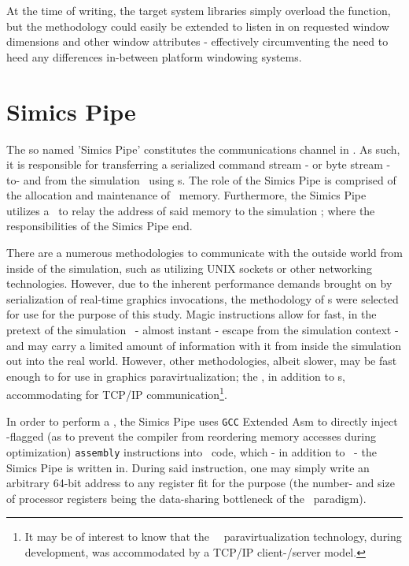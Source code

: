 At the time of writing, the target system libraries simply overload the  function, but the methodology could easily be extended to listen in on requested window dimensions and other window attributes - effectively circumventing the need to heed any differences in-between platform windowing systems.

\section{Simics Pipe}
\label{sec:proposedsolutionandimplementation_simicspipe}
The so named 'Simics Pipe' constitutes the communications channel in \dvttermsimics .
As such, it is responsible for transferring a serialized command stream - or byte stream - to- and from the simulation \dvttermhost\ using \dvttermmagicinstruction s.
The role of the Simics Pipe is comprised of the allocation and maintenance of  \dvttermtarget\ memory.
Furthermore, the Simics Pipe utilizes a \dvttermmagicinstruction\ to relay the address of said memory to the simulation \dvttermhost ; where the responsibilities of the Simics Pipe end.

There are a numerous methodologies to communicate with the outside world from inside of the simulation, such as utilizing UNIX sockets or other networking technologies.
However, due to the inherent performance demands brought on by serialization of real-time graphics invocations, the methodology of \dvttermmagicinstruction s were selected for use for the purpose of this study.
Magic instructions allow for fast, in the pretext of the simulation \dvttermtarget\ - almost instant - escape from the simulation context - and may carry a limited amount of information with it from inside the simulation out into the real world.
However, other methodologies, albeit slower, may be fast enough to for use in graphics paravirtualization; the \dvttermandroidemulator , in addition to \dvttermmagicinstruction s, accommodating for TCP/IP communication\footnote{It may be of interest to know that the \dvttermsimics\ \dvttermopengles\ paravirtualization technology, during development, was accommodated by a TCP/IP client-/server model.}.

In order to perform a \dvttermmagicinstruction , the Simics Pipe uses \texttt{GCC} Extended Asm to directly inject -flagged (as to prevent the compiler from reordering memory accesses during optimization) \texttt{assembly} instructions into \dvttermc\ code, which - in addition to \dvttermcplusplus\ - the Simics Pipe is written in.
During said instruction, one may simply write an arbitrary 64-bit address to any register fit for the purpose (the number- and size of processor registers being the data-sharing bottleneck of the \dvttermmagicinstruction\ paradigm).

